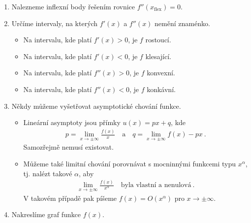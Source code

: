 \begin{enumerate}
    \item Nalezneme inflexní body řešením rovnice $f''(x_{\text{flex}}) = 0$.
    
    \item Určíme intervaly, na kterých $f'(x)$ a $f''(x)$ nemění znaménko.
    \begin{itemize}
        \item Na intervalu, kde platí $f'(x) > 0$, je $f$ rostoucí.
        \item Na intervalu, kde platí $f'(x) < 0$, je $f$ klesající.
        \item Na intervalu, kde platí $f''(x) > 0$, je $f$ konvexní.
        \item Na intervalu, kde platí $f''(x) < 0$, je $f$ konkávní.
    \end{itemize}

    \item Někdy můžeme vyšetřovat asymptotické chování funkce.
    \begin{itemize}
        \item Lineární asymptoty jsou přímky $u(x) = px+q$, kde 
        \begin{align*}
            p = \lim_{x \rightarrow \pm \infty} \frac{f(x)}{x} \quad \text{a} \quad q = \lim_{x \rightarrow \pm \infty} f(x) - px \:.
        \end{align*}
        Samozřejmě nemusí existovat.
        \item Můžeme také limitní chování porovnávat s mocninnými funkcemi typu $x^\alpha$, tj. nalézt takové $\alpha$, aby \begin{align*}
            \lim_{x \rightarrow \pm \infty} \frac{f(x)}{x^\alpha} \quad \text{byla vlastní a nenulová} \:.
        \end{align*}
        V takovém případě pak píšeme $f(x) = O(x^\alpha)$ pro $x \rightarrow \pm \infty$.
    \end{itemize}

    \item Nakreslíme graf funkce $f(x)$.
\end{enumerate}

